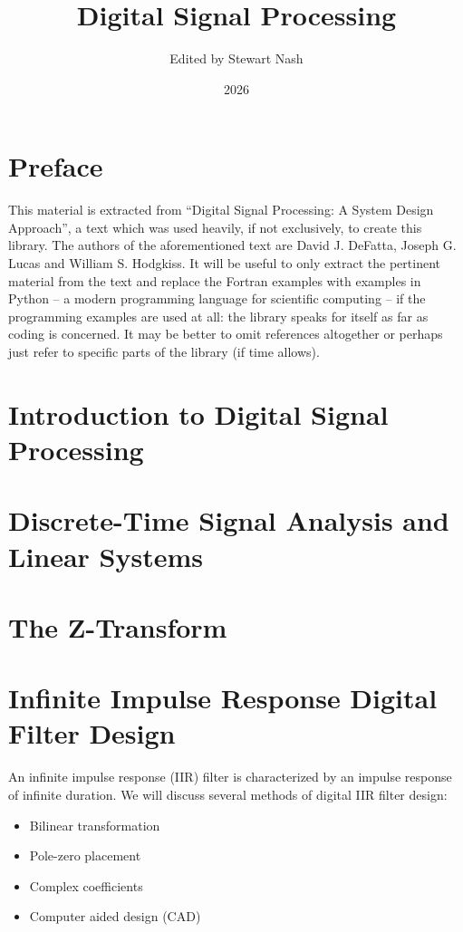 \documentclass[11pt]{book}
\theoremstyle{example}
\begin{document}
\title{Digital Signal Processing}
\author{Edited by Stewart Nash}
\date{2026}

\frontmatter

\maketitle

\chapter*{Preface}
This material is extracted from ``Digital Signal Processing: A System Design Approach'', a text which was used heavily, if not exclusively, to create this library. The authors of the aforementioned text are David J. DeFatta, Joseph G. Lucas and William S. Hodgkiss. It will be useful to only extract the pertinent material from the text and replace the Fortran examples with examples in Python -- a modern programming language for scientific computing -- if the programming examples are used at all: the library speaks for itself as far as coding is concerned. It may be better to omit references altogether or perhaps just refer to specific parts of the library (if time allows).  

\tableofcontents

\mainmatter

\chapter{Introduction to Digital Signal Processing}

\chapter[Discrete Signals and Linear Systems]{Discrete-Time Signal Analysis and Linear Systems}

\chapter{The Z-Transform}

\chapter[IIR Digital Filter Design]{Infinite Impulse Response Digital Filter Design}

An infinite impulse response (IIR) filter is characterized by an impulse response of infinite duration. We will discuss several methods of digital IIR filter design:
\begin{itemize}
	\item Bilinear transformation
	\item Pole-zero placement
	\item Complex coefficients
	\item Computer aided design (CAD)
\end{itemize}
\end{document}
